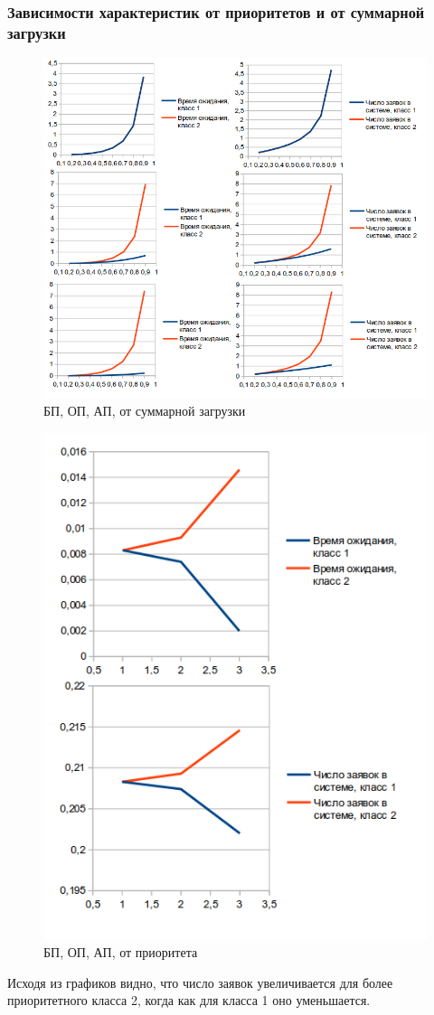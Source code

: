 \subsubsection{Зависимости характеристик от приоритетов и от суммарной загрузки}
\begin{figure}[h]
\centering
\includegraphics[resolution=128]{img/bp_op_ap_load.png}
\caption{БП, ОП, АП, от суммарной загрузки}
\end{figure}

\begin{figure}[h]
\centering
\includegraphics[resolution=128]{img/bp_op_ap_prio.png}
\caption{БП, ОП, АП, от приоритета}
\end{figure}

Исходя из графиков видно, что число заявок увеличивается для более приоритетного
класса 2, когда как для класса 1 оно уменьшается.

